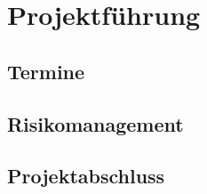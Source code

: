 \section{Projektführung}

\subsection{Termine}

\subsection{Risikomanagement}

\subsection{Projektabschluss}

\newpage